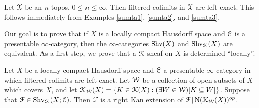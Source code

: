 \begin{example}\label{tucka}
Let $\operatorname{\mathcal{X}}$ be an $n$-topos, $0 \leq n \leq \infty$. Then filtered colimits in $\operatorname{\mathcal{X}}$ are left exact. This follows immediately from Examples \ref{sumta1}, \ref{sumta2}, and \ref{sumta3}.
\end{example}

Our goal is to prove that if $X$ is a locally compact Hausdorff space and $\operatorname{\mathcal{C}}$ is a presentable $\infty$-category, then the $\infty$-categories $\operatorname{Shv}(X)$ and $\operatorname{Shv}_{\operatorname{\mathcal{K}}}(X)$ are equivalent. As a first step, we prove that a $\operatorname{\mathcal{K}}$-sheaf on $X$ is determined ``locally''.

\begin{lemma}\label{noodlesoup}
Let $X$ be a locally compact Hausdorff space and $\operatorname{\mathcal{C}}$ a presentable $\infty$-category in which filtered colimits are left exact.
Let $\operatorname{\mathcal{W}}$ be a collection of open
subsets of $X$ which covers $X$, and let $\operatorname{\mathcal{K}}_{\operatorname{\mathcal{W}}}(X) = \{ K \in \operatorname{\mathcal{K}}(X): (\exists W \in \operatorname{\mathcal{W}}) [ K \subseteq W] \}$. Suppose that $\operatorname{\mathcal{F}} \in \operatorname{Shv}_{\operatorname{\mathcal{K}}}(X;\operatorname{\mathcal{C}})$. Then
$\operatorname{\mathcal{F}}$ is a right Kan extension of $\operatorname{\mathcal{F}} | \operatorname{N}(\operatorname{\mathcal{K}}_{\operatorname{\mathcal{W}}}(X))^{op}$. 
\end{lemma}

